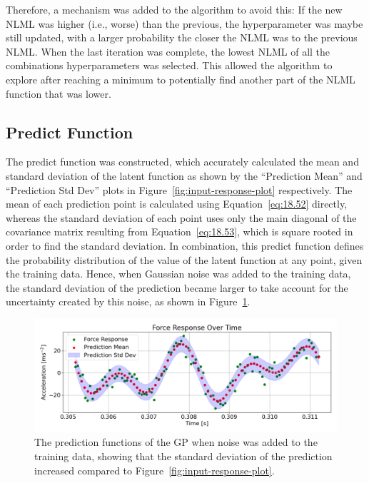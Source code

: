\documentclass[12pt]{article}
\begin{document}
    Therefore, a mechanism was added to the algorithm to avoid this:
    If the new NLML was higher (i.e., worse) than the previous, the hyperparameter was maybe still updated, with a larger probability the closer the NLML was to the previous NLML\@.
    When the last iteration was complete, the lowest NLML of all the combinations hyperparameters was selected.
    This allowed the algorithm to explore after reaching a minimum to potentially find another part of the NLML function that was lower.

    \subsection{Predict Function}
    The predict function was constructed, which accurately calculated the mean and standard deviation of the latent function as shown by the ``Prediction Mean'' and ``Prediction Std Dev'' plots in Figure~\ref{fig:input-response-plot} respectively.
    The mean of each prediction point is calculated using Equation~\ref{eq:18.52} directly, whereas the standard deviation of each point uses only the main diagonal of the covariance matrix resulting from Equation~\ref{eq:18.53}, which is square rooted in order to find the standard deviation.
    In combination, this predict function defines the probability distribution of the value of the latent function at any point, given the training data.
    Hence, when Gaussian noise was added to the training data, the standard deviation of the prediction became larger to take account for the uncertainty created by this noise, as shown in Figure~\ref{fig:input-response-noise}.

    \begin{figure}[ht]
        \centering
        \includegraphics[width=1.0\linewidth]{figures/input-response-noise/input-response-noise.png}
        \caption{The prediction functions of the GP when noise was added to the training data, showing that the standard deviation of the prediction increased compared to Figure~\ref{fig:input-response-plot}.}
        \label{fig:input-response-noise}
    \end{figure}
\end{document}
